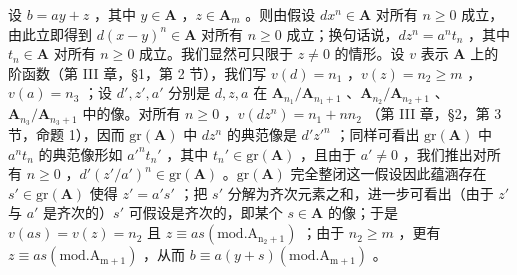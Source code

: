 设 \(b = ay + z\) ，其中 \(y \in \mathbf{A}\) ，\(z \in \mathbf{A}_m\) 。则由假设 \(dx^n \in \mathbf{A}\) 对所有 \(n \geqslant 0\) 成立，由此立即得到 \(d(x - y)^n \in \mathbf{A}\) 对所有 \(n \geqslant 0\) 成立；换句话说，\(dz^n = a^n t_n\) ，其中 \(t_n \in \mathbf{A}\) 对所有 \(n \geqslant 0\) 成立。我们显然可只限于 \(z \neq 0\) 的情形。设 \(v\) 表示 \(\mathbf{A}\) 上的阶函数（第 III 章，§1，第 2 节），我们写 \(v(d) = n_1\) ，\(v(z) = n_2 \geqslant m\) ，\(v(a) = n_3\) ；设 \(d', z', a'\) 分别是 \(d, z, a\) 在 \(\mathbf{A}_{n_1}/\mathbf{A}_{n_1+1}\) 、\(\mathbf{A}_{n_2}/\mathbf{A}_{n_2+1}\) 、\(\mathbf{A}_{n_3}/\mathbf{A}_{n_3+1}\) 中的像。对所有 \(n \geqslant 0\) ，\(v(dz^n) = n_1 + nn_2\) （第 III 章，§2，第 3 节，命题 1），因而 \(\mathrm{gr}(\mathbf{A})\) 中 \(dz^n\) 的典范像是 \(d'z'^n\) ；同样可看出 \(\mathrm{gr}(\mathbf{A})\) 中 \(a^n t_n\) 的典范像形如 \(a'^n t_n'\) ，其中 \(t_n' \in \mathrm{gr}(\mathbf{A})\) ，且由于 \(a' \neq 0\) ，我们推出对所有 \(n \geqslant 0\) ，\(d'(z'/a')^n \in \mathrm{gr}(\mathbf{A})\) 。\(\mathrm{gr}(\mathbf{A})\) 完全整闭这一假设因此蕴涵存在 \(s' \in \mathrm{gr}(\mathbf{A})\) 使得 \(z' = a's'\) ；把 \(s'\) 分解为齐次元素之和，进一步可看出（由于 \(z'\) 与 \(a'\) 是齐次的）\(s'\) 可假设是齐次的，即某个 \(s \in \mathbf{A}\) 的像；于是 \(v(as) = v(z) = n_2\) 且 \(z \equiv as (\mathrm{mod. A_{n_2+1}})\) ；由于 \(n_2 \geqslant m\) ，更有 \(z \equiv as (\mathrm{mod. A_{m+1}})\) ，从而 \(b \equiv a(y + s) (\mathrm{mod. A_{m+1}})\) 。
